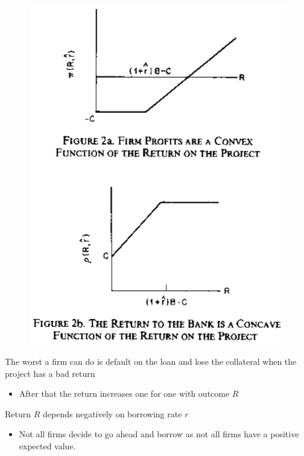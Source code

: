 \documentclass{beamer}
\begin{document}
\begin{frame}
  \begin{figure}
    \includegraphics{stiglitz_weiss2.eps}
  \end{figure}
\end{frame}

\begin{frame}
The worst a firm can do is default on the loan and lose the collateral when the project has a bad return
\begin{itemize}
  \item After that the return increases one for one with outcome $R$  
\end{itemize}
\medskip
Return $R$ depends negatively on borrowing rate $r$
\begin{itemize}
  \item Not all firms decide to go ahead and borrow as not all firms have a positive expected value.
\end{itemize}
\end{frame}
\end{document}
